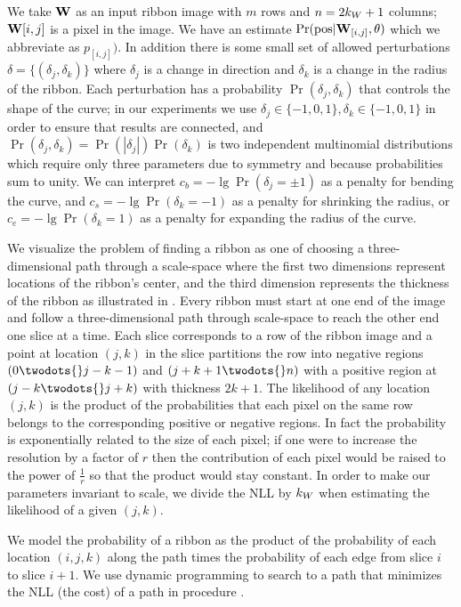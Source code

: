 We take $\mathbf{W}{}$ as an input ribbon image with $m$ rows and $n=2k_W+1$ columns; $\mathbf{W}{}{[i,j]}$ is a pixel in the image. We have an estimate $\Pr(\text{pos}|\mathbf{W}{}_{[i,j]}, \theta)$ which we abbreviate as $p_{[i,j]})$. In addition there is some small set of allowed perturbations $\delta=\{(\delta_j, \delta_k)\}$ where $\delta_j$ is a change in direction and $\delta_k$ is a change in the radius of the ribbon. Each perturbation has a probability $\Pr(\delta_j, \delta_k)$ that controls the shape of the curve; in our experiments we use $\delta_j\in\{-1,0,1\}, \delta_k\in\{-1, 0,1\}$ in order to ensure that results are connected, and  $\Pr(\delta_j, \delta_k)=\Pr(|\delta_j|)\Pr(\delta_k)$ is two independent multinomial distributions which require only three parameters due to symmetry and because probabilities sum to unity. We can interpret $c_b=-\lg \Pr(\delta_j=\pm1)$ as a penalty for bending the curve, and $c_s=-\lg \Pr(\delta_k=-1)$ as a penalty for shrinking the radius, or $c_e = -\lg \Pr(\delta_k=1)$ as a penalty for expanding the radius of the curve. 

We visualize the problem of finding a ribbon as one of choosing a
three-dimensional path through a scale-space where the first two dimensions
represent locations of the ribbon's center, and the third dimension represents
the thickness of the ribbon as illustrated in . Every
ribbon must start at one end of the image and follow a three-dimensional path
through scale-space to reach the other end one slice at a time. Each slice
corresponds to a row of the ribbon image and a point at location $(j, k)$ in the
slice partitions the row into negative regions $(0\twodots{}j-k-1)$ and
$(j+k+1\twodots{}n)$ with a positive region at $(j-k \twodots{} j+k)$ with
thickness $2k+1$. The likelihood of any location $(j, k)$ is the product of the
probabilities that each pixel on the same row belongs to the corresponding
positive or negative regions.  In fact the probability is exponentially related
to the size of each pixel; if one were to increase the resolution by a factor of
$r$ then the contribution of each pixel would be raised to the power of
$\frac{1}{r}$ so that the product would stay constant. In order to make our
parameters invariant to scale, we divide the \ac{NLL} by $k_W{}$ when
estimating the likelihood of a given $(j,k)$. 

We model the probability of a ribbon as the product of the probability of each location $(i, j, k)$ along the path times the probability of each edge from slice $i$ to slice $i+1$. We use dynamic programming to search to a path that minimizes the \ac{NLL} (the cost) of a path in procedure .

